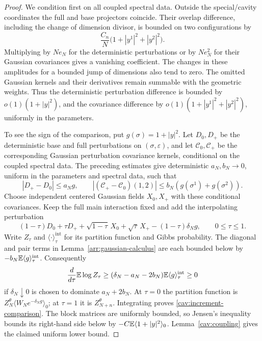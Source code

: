 \begin{proof}
We condition first on all coupled spectral data.  Outside the
special/cavity coordinates the full and base projectors coincide.
Their overlap difference, including the change of dimension divisor,
is bounded on two configurations by
\begin{equation}\label{cav:overlap-error}
 \frac{C_n}{N}\big(1+|y^1|^2+|y^2|^2\big).
\end{equation}
Multiplying by $Ne_N$ for the deterministic perturbations or by
$Ne_N^2$ for their Gaussian covariances gives a vanishing coefficient.
The changes in these amplitudes for a bounded jump of dimensions also
tend to zero.  The omitted Gaussian kernels and their derivatives
remain summable with the geometric weights.  Thus the deterministic
perturbation difference is bounded by
$o(1)(1+|y|^2)$, and the covariance difference by
$o(1)(1+|y^1|^2+|y^2|^2)$, uniformly in the parameters.

To see the sign of the comparison, put $g(\sigma)=1+|y|^2$.
Let $D_0,D_+$ be the deterministic base and full perturbations on
$(\sigma,\varepsilon)$, and let $\mathcal C_0,\mathcal C_+$ be the
corresponding Gaussian perturbation covariance kernels, conditional on
the coupled spectral data.
The preceding estimates give deterministic $a_N,b_N\to0$, uniform
in the parameters and spectral data, such that
\[
 |D_+-D_0|\le a_Ng,\qquad
 |(\mathcal C_+-\mathcal C_0)(1,2)|
       \le b_N(g(\sigma^1)+g(\sigma^2)).
\]
Choose independent centered Gaussian fields $X_0,X_+$ with these
conditional covariances.  Keep the full main interaction fixed and add
the interpolating perturbation
\[
 (1-\tau)D_0+\tau D_+
 +\sqrt{1-\tau}\,X_0+\sqrt\tau\,X_+
 -(1-\tau)\delta_Ng,\qquad 0\le\tau\le1.
\]
Write $Z_\tau$ and $\langle\cdot\rangle_\tau^{\mathrm{int}}$ for its partition
function and Gibbs probability.  The diagonal and pair terms in
Lemma~\ref{arr:gaussian-calculus} are each bounded below by
$-b_N\mathbb E\langle g\rangle_\tau^{\mathrm{int}}$.  Consequently
\[
 \frac{d}{d\tau}\mathbb E\log Z_\tau
 \ge(\delta_N-a_N-2b_N)\mathbb E\langle g\rangle_\tau^{\mathrm{int}}\ge0
\]
if $\delta_N\downarrow0$ is chosen to dominate $a_N+2b_N$.
At $\tau=0$ the partition function is
$Z_N^\theta\langle W_Ne^{-\delta_Ng}\rangle_0$;
at $\tau=1$ it is $Z_{N+n}^\theta$.  Integrating proves
\eqref{cav:increment-comparison}.  The block matrices are
uniformly bounded, so Jensen's inequality bounds its right-hand side
below by $-C\mathbb E\langle1+|y|^2\rangle_0$.  Lemma~\ref{cav:coupling}
gives the claimed uniform lower bound.


\end{proof}
